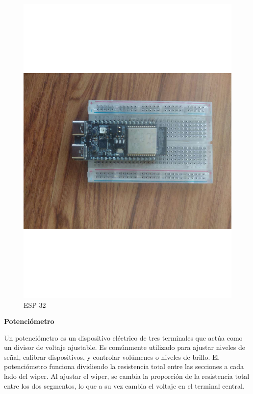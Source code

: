 \begin{figure}[H]
        \centering
        \includegraphics[trim = {40mm 120mm 50mm 100mm},clip,scale=0.2]{10/Img/esp-32.pdf}
        \caption{ESP-32}
        \label{ESP-32}
\end{figure}

\textbf{Potenciómetro}

Un potenciómetro es un dispositivo eléctrico de tres terminales que actúa como un divisor de voltaje ajustable. Es comúnmente utilizado para ajustar niveles de señal, calibrar dispositivos, y controlar volúmenes o niveles de brillo.
El potenciómetro funciona dividiendo la resistencia total entre las secciones a cada lado del wiper. Al ajustar el wiper, se cambia la proporción de la resistencia total entre los dos segmentos, lo que a su vez cambia el voltaje en el terminal central. \cite{Potenciómetro}

